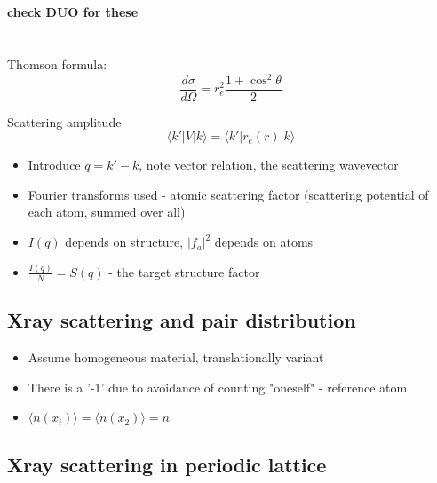 \documentclass[a4paper, 11pt, normalem]{report}
\begin{document}
\chapter{}

\textbf{check DUO for these}

\chapter{}

Thomson formula:
\begin{equation}
    \frac{d\sigma}{d\Omega} = r_e^2\frac{1 + \cos^2\theta}{2}
\end{equation}

Scattering amplitude
\begin{equation}
    \langle k'|V|k\rangle = \langle k'|r_e(r)|k\rangle
\end{equation}

\begin{itemize}
    \item Introduce $q = k' - k$, note vector relation, the scattering wavevector

    \item Fourier transforms used - atomic scattering factor (scattering potential of each atom, summed over all)

    \item $I(q)$ depends on structure, $|f_a|^2$ depends on atoms

    \item $\frac{I(q)}{N} = S(q)$ - the target structure factor
\end{itemize}

\section{Xray scattering and pair distribution}

\begin{itemize}
    \item Assume homogeneous material, translationally variant
    \item There is a '-1' due to avoidance of counting "oneself" - reference atom
    \item $\langle n(x_i)\rangle = \langle n(x_2)\rangle = n$
\end{itemize}

\section{Xray scattering in periodic lattice}
\end{document}
